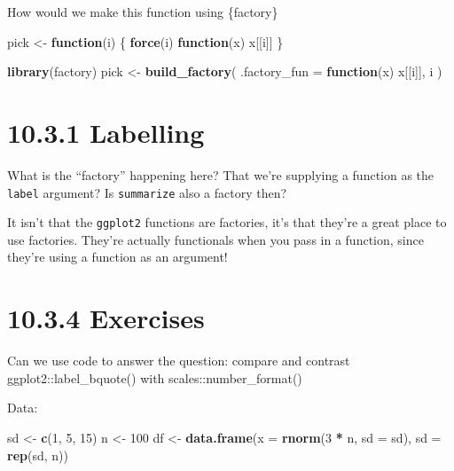 \documentclass[]{book}
\newenvironment{Shaded}{\begin{snugshade}}{\end{snugshade}}
\newcommand{\ControlFlowTok}[1]{\textcolor[rgb]{0.13,0.29,0.53}{\textbf{#1}}}
\newcommand{\DataTypeTok}[1]{\textcolor[rgb]{0.13,0.29,0.53}{#1}}
\newcommand{\DecValTok}[1]{\textcolor[rgb]{0.00,0.00,0.81}{#1}}
\newcommand{\KeywordTok}[1]{\textcolor[rgb]{0.13,0.29,0.53}{\textbf{#1}}}
\newcommand{\NormalTok}[1]{#1}
\newcommand{\OperatorTok}[1]{\textcolor[rgb]{0.81,0.36,0.00}{\textbf{#1}}}
\newcommand{\StringTok}[1]{\textcolor[rgb]{0.31,0.60,0.02}{#1}}
\begin{document}
How would we make this function using \{factory\}

\begin{Shaded}
\begin{Highlighting}[]
\NormalTok{pick <-}\StringTok{ }\ControlFlowTok{function}\NormalTok{(i) \{}
  \KeywordTok{force}\NormalTok{(i)}
  \ControlFlowTok{function}\NormalTok{(x) x[[i]]}
\NormalTok{\}}
\end{Highlighting}
\end{Shaded}

\begin{Shaded}
\begin{Highlighting}[]
\KeywordTok{library}\NormalTok{(factory)}
\NormalTok{pick <-}\StringTok{ }\KeywordTok{build_factory}\NormalTok{(}
  \DataTypeTok{.factory_fun =} \ControlFlowTok{function}\NormalTok{(x) x[[i]],}
\NormalTok{  i}
\NormalTok{)}
\end{Highlighting}
\end{Shaded}

\hypertarget{labelling}{%
\section*{10.3.1 Labelling}\label{labelling}}

What is the ``factory'' happening here? That we're supplying a function as the \texttt{label} argument? Is \texttt{summarize} also a factory then?

It isn't that the \texttt{ggplot2} functions are factories, it's that they're a great place to use factories. They're actually functionals when you pass in a function, since they're using a function as an argument!

\hypertarget{exercises-8}{%
\section*{10.3.4 Exercises}\label{exercises-8}}

Can we use code to answer the question: compare and contrast ggplot2::label\_bquote() with scales::number\_format()

Data:

\begin{Shaded}
\begin{Highlighting}[]
\NormalTok{sd <-}\StringTok{ }\KeywordTok{c}\NormalTok{(}\DecValTok{1}\NormalTok{, }\DecValTok{5}\NormalTok{, }\DecValTok{15}\NormalTok{)}
\NormalTok{n <-}\StringTok{ }\DecValTok{100}
\NormalTok{df <-}\StringTok{ }\KeywordTok{data.frame}\NormalTok{(}\DataTypeTok{x =} \KeywordTok{rnorm}\NormalTok{(}\DecValTok{3} \OperatorTok{*}\StringTok{ }\NormalTok{n, }\DataTypeTok{sd =}\NormalTok{ sd), }\DataTypeTok{sd =} \KeywordTok{rep}\NormalTok{(sd, n))}
\end{Highlighting}
\end{Shaded}
\end{document}
